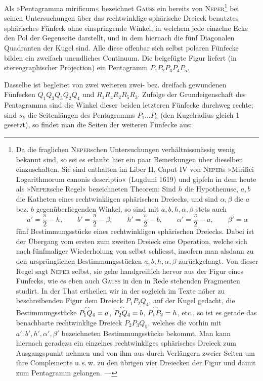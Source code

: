 Als »Pentagramma mirificum« bezeichnet \textsc{Gauss} ein bereits von \textsc{Neper}\footnote{Da die
fraglichen \textsc{Neper}schen Untersuchungen verhältnissmässig wenig bekannt sind, so sei es erlaubt
hier ein paar Bemerkungen über dieselben einzuschalten. Sie sind enthalten im Liber II,
Caput IV
von \textsc{Neper}s »Mirifici Logarithmorum canonis descriptio« (Lugduni 1619) und
gipfeln in dem heute als »\textsc{Neper}sche Regel« bezeichneten Theorem: Sind $h$ die Hypothenuse,
$a, b$ die Katheten eines rechtwinkligen sphärischen Dreiecks, und sind $\alpha, \beta$ die
$a$ bez. $b$ gegenüberliegenden Winkel, so sind mit $a, b, h, \alpha, \beta$ stets auch
\[
a' = \frac{\pi}{2}-h, \qquad b' = \frac{\pi}{2}-\beta, \qquad h' = \frac{\pi}{2}-b, \qquad
\alpha' = \frac{\pi}{2}-a, \qquad \beta' = \alpha
\]
fünf Bestimmungsstücke eines rechtwinkligen sphärischen Dreiecks. Dabei ist der Übergang
vom ersten zum zweiten Dreieck eine Operation, welche sich nach fünfmaliger Wiederholung
von selbst schliesst, insofern man alsdann zu den ursprünglichen Bestimmungsstücken
$a, b, h, \alpha, \beta$ zurückgelangt. Von dieser Regel sagt \textsc{Neper} selbst, sie gehe
handgreiflich hervor aus der Figur eines Fünfecks, wie es eben auch \textsc{Gauss} in den in Rede
stehenden Fragmenten studirt. In der That ertheilen wir in der sogleich im Texte näher zu
beschreibenden Figur dem Dreieck $P_1P_2Q_4$, auf der Kugel gedacht, die Bestimmungsstücke
$\overset{\frown}{P_1Q_4}=a$, $\overset{\frown}{P_2Q_4}=b$, $\overset{\frown}{P_1P_2}=h$, etc., so ist es gerade das
benachbarte rechtwinklige Dreieck $P_2P_3Q_5$, welches die vorhin mit $a', b', h', \alpha',
\beta'$ bezeichneten Bestimmungsstücke bekommt. Man kann hiernach geradezu ein einzelnes
rechtwinkliges sphärisches Dreieck zum Ausgangspunkt nehmen und von ihm aus durch
Verlängern zweier Seiten um ihre Complemente u.\,s.\,w. zu den übrigen vier Dreiecken der
Figur und damit zum Pentagramm gelangen. ---} bei seinen Untersuchungen über das rechtwinklige sphärische Dreieck benutztes sphärisches
Fünfeck ohne einspringende Winkel, in welchem jede einzelne Ecke den Pol der Gegenseite
darstellt, und in dem hiernach die fünf Diagonalen Quadranten der Kugel sind. Alle diese
offenbar sich selbst polaren Fünfecke bilden ein zweifach unendliches Continuum. Die
beigefügte Figur liefert (in stereographischer Projection) ein Pentagramm
$P_1P_2P_3P_4P_5$.

\begin{center}\end{center}

Dasselbe ist begleitet von zwei weiteren zwei- bez. dreifach gewundenen Fünfecken
$Q_1Q_3Q_5Q_2Q_4$ und $R_1R_4R_2R_5R_3$. Zufolge der Grundeigenschaft des Pentagramma sind
die Winkel dieser beiden letzteren Fünfecke durchweg rechte; sind $s_k$ die Seitenlängen des Pentagramms $P_1\ldots P_5$ (den
Kugelradius gleich 1 gesetzt), so findet man die Seiten der weiteren Fünfecke aus:

